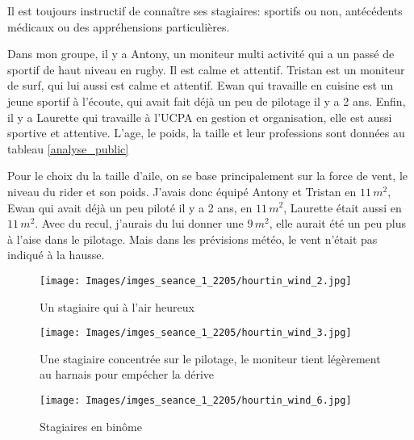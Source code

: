 \documentclass[11pt,a4paper]{report}
\begin{document}
Il est toujours instructif de connaître ses stagiaires: 
sportifs ou non, antécédents médicaux ou des appréhensions particulières.

Dans mon groupe, il y a Antony, un moniteur multi activité qui a un passé 
de sportif de haut niveau en rugby. Il est calme et attentif.
Tristan est un moniteur de surf, qui lui aussi est calme et attentif.
Ewan qui travaille en cuisine est un jeune sportif à l'écoute, qui avait 
fait déjà un peu de pilotage il y a 2 ans.
Enfin, il y a Laurette qui travaille à l'UCPA en gestion et 
organisation, elle est aussi  sportive et attentive. L'age, le poids, la taille
et leur professions sont données au tableau \ref{analyse_public}

Pour le choix du la taille d'aile, on se base principalement sur la force
de vent, le niveau du rider et son poids. J'avais donc équipé Antony et Tristan
en $11\, m^2$, Ewan qui avait déjà un peu piloté il y a 2 ans, en $11\, m^2$,
 Laurette était aussi en $11\, m^2$.
Avec du recul, j'aurais du lui donner une  $9\, m^2$, elle aurait été un peu plus
à l'aise dans le pilotage. Mais dans les prévisions météo, le vent n'était pas
indiqué à la hausse.

\begin{figure}
\begin{minipage}{0.4\textwidth}
\texttt{[image: Images/imges\_seance\_1\_2205/hourtin\_wind\_2.jpg]} 
\caption{Un stagiaire qui à l'air heureux}
\end{minipage}
\hfill
\begin{minipage}{0.4\textwidth}
\texttt{[image: Images/imges\_seance\_1\_2205/hourtin\_wind\_3.jpg]} 
\caption{Une stagiaire concentrée sur le pilotage, le moniteur tient légèrement
au harnais pour emp\'echer la dérive}
\end{minipage}
\end{figure}

\begin{figure}
\centering
\texttt{[image: Images/imges\_seance\_1\_2205/hourtin\_wind\_6.jpg]}
\caption{Stagiaires en bin\^ome} 
\end{figure}
\end{document}
